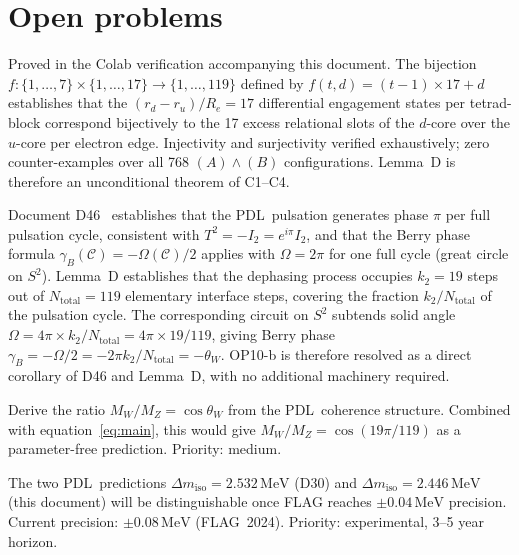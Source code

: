 \documentclass[12pt,a4paper]{article}
\theoremstyle{plain}
\theoremstyle{definition}
\theoremstyle{remark}
\newenvironment{openproblem}[1][]{%
  \begin{tcolorbox}[openproblemstyle,title={Open Problem\ifx\relax#1\relax\else: #1\fi}]}{\end{tcolorbox}}
\newenvironment{resolvedproblem}[1][]{%
  \begin{tcolorbox}[resolvedstyle,title={Resolved: #1}]}{\end{tcolorbox}}
\newcommand{\PDL}{\textsc{PDL}}
\renewcommand{\Re}{R_e}
\newcommand{\ru}{r_u}
\newcommand{\rd}{r_d}
\newcommand{\thetaW}{\theta_W}
\newcommand{\Ntot}{N_{\mathrm{total}}}
\newcommand{\Dmiso}{\Delta m_{\mathrm{iso}}}
\newcommand{\ktwo}{k_2}
\begin{document}
\section{Open problems}
\label{sec:open}

\begin{resolvedproblem}[OP10-a — Bijection step of Lemma~D]
Proved in the Colab verification accompanying this document. The bijection $f : \{1,\ldots,7\} \times \{1,\ldots,17\} \to \{1,\ldots,119\}$ defined by $f(t,d) = (t-1)\times 17 + d$ establishes that the $(\rd-\ru)/\Re = 17$ differential engagement states per tetrad-block correspond bijectively to the 17 excess relational slots of the $d$-core over the $u$-core per electron edge. Injectivity and surjectivity verified exhaustively; zero counter-examples over all 768 $(A)\wedge(B)$ configurations. Lemma~D is therefore an unconditional theorem of C1--C4.
\end{resolvedproblem}

\begin{resolvedproblem}[OP10-b — Berry phase identification]
Document D46~\cite{PDL_D46} establishes that the \PDL\ pulsation generates phase $\pi$ per full pulsation cycle, consistent with $T^2 = -I_2 = e^{i\pi}I_2$, and that the Berry phase formula $\gamma_B(\mathcal{C}) = -\Omega(\mathcal{C})/2$ applies with $\Omega = 2\pi$ for one full cycle (great circle on $S^2$). Lemma~D establishes that the dephasing process occupies $\ktwo = 19$ steps out of $\Ntot = 119$ elementary interface steps, covering the fraction $\ktwo/\Ntot$ of the pulsation cycle. The corresponding circuit on $S^2$ subtends solid angle $\Omega = 4\pi\times\ktwo/\Ntot = 4\pi\times19/119$, giving Berry phase $\gamma_B = -\Omega/2 = -2\pi\ktwo/\Ntot = -\thetaW$. OP10-b is therefore resolved as a direct corollary of D46 and Lemma~D, with no additional machinery required.
\end{resolvedproblem}

\begin{openproblem}[OP10-c — $W/Z$ mass ratio]
Derive the ratio $M_W/M_Z = \cos\thetaW$ from the \PDL\ coherence structure. Combined with equation~\eqref{eq:main}, this would give $M_W/M_Z = \cos(19\pi/119)$ as a parameter-free prediction. Priority: medium.
\end{openproblem}

\begin{openproblem}[OP10-d — Lattice QCD test of $\Dmiso$]
The two \PDL\ predictions $\Dmiso = 2.532\,\mathrm{MeV}$ (D30) and $\Dmiso = 2.446\,\mathrm{MeV}$ (this document) will be distinguishable once FLAG reaches $\pm 0.04\,\mathrm{MeV}$ precision. Current precision: $\pm 0.08\,\mathrm{MeV}$ (FLAG~2024). Priority: experimental, 3--5 year horizon.
\end{openproblem}
\end{document}
